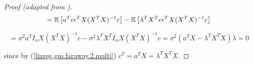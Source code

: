 \begin{proof}[Proof (adapted from \citet{faraway2002})]
\[
=   \E \left[ a^T \epsilon \epsilon^T X (X^TX)^{-1}   c \right]  -\E \left[  \lambda^T  X^T \epsilon  \epsilon^T X (X^TX)^{-1}   c  \right] 
\]

\[
=   \sigma^2 a^T I_n X (X^TX)^{-1}   c  - \sigma^2  \lambda^T  X^T I_n  X (X^TX)^{-1}   c  
=   \sigma^2  \left (a^T  X    -  \lambda^T      X^TX \right) \lambda  = 0
\]
%
%
%
%
%
%
%

since by (\ref{linreg.gm.faraway.2.multi}) \(c^T = a^TX =  \lambda^TX^T X\).



\end{proof}


